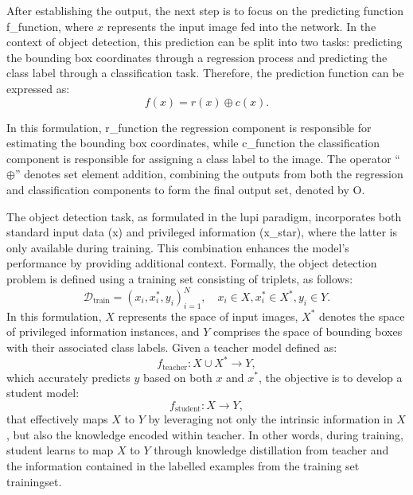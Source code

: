 After establishing the output, the next step is to focus on the predicting function \gls{f_function}, where \( x \) represents the input image fed into the network. In the context of object detection, this prediction can be split into two tasks: predicting the bounding box coordinates through a regression process and predicting the class label through a classification task. Therefore, the prediction function can be expressed as:
\begin{equation}
\label{eq:prediction_function}
f(x) = r(x) \oplus c(x).
\end{equation}

In this formulation, \gls{r_function} the regression component is responsible for estimating the bounding box coordinates, while \gls{c_function} the classification component is responsible for assigning a class label to the image. The operator ``\(\oplus\)'' denotes set element addition, combining the outputs from both the regression and classification components to form the final output set, denoted by \gls{O}.

The object detection task, as formulated in the \gls{lupi} paradigm, incorporates both standard input data (\gls{x}) and privileged information (\gls{x_star}), where the latter is only available during training. This combination enhances the model's performance by providing additional context. Formally, the object detection problem is defined using a training set consisting of triplets, as follows:
\begin{equation} \label{eq:object_detection}
\mathcal D_{\text{train}} = {(x_i, x_i^*, y_i)}_{i=1}^N, \quad x_i \in X , x_i^* \in X^*, y_i \in Y.
\end{equation}
In this formulation, \( X \) represents the space of input images, \( X^* \) denotes the space of privileged information instances, and \( Y \) comprises the space of bounding boxes with their associated class labels. Given a teacher model defined as:
\begin{equation}
f_{\text{teacher}}: X \cup X^* \rightarrow Y,
\end{equation}
which accurately predicts \( y \) based on both \( x \) and \( x^* \), the objective is to develop a student model:
\begin{equation}
f_{\text{student}}: X \rightarrow Y,
\end{equation}
that effectively maps \( X \) to \( Y \) by leveraging not only the intrinsic information in \( X \), but also the knowledge encoded within \gls{teacher}. In other words, during training, \gls{student} learns to map \( X \) to \( Y \) through knowledge distillation from \gls{teacher} and the information contained in the labelled examples from the training set \gls{trainingset}.

